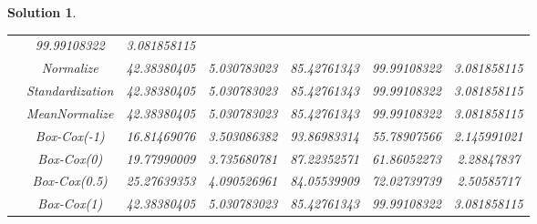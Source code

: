 \documentclass[a4paper,UTF8]{article}
\numberwithin{equation}{section}
\newtheorem*{mySol}{Solution}
\begin{document}
\begin{mySol}
\begin{table}[]
\begin{tabular}{ccccccc}
				         & 99.99108322
				           & 3.081858115 \\
				& Normalize & 42.38380405
				&  5.030783023
				&  85.42761343
				& 99.99108322
				& 3.081858115 \\
				& Standardization  & 42.38380405
				&  5.030783023
				&  85.42761343
				& 99.99108322
				& 3.081858115 \\
				& MeanNormalize & 42.38380405
				&  5.030783023
				&  85.42761343
				& 99.99108322
				& 3.081858115 \\
				& Box-Cox(-1) & 16.81469076	& 3.503086382	& 93.86983314 &	55.78907566	& 2.145991021 \\
				& Box-Cox(0) &	19.77990009 & 	3.735680781	& 87.22352571	& 61.86052273	& 2.28847837 \\
				& Box-Cox(0.5) & 25.27639353 &	4.090526961	& 84.05539909	& 72.02739739	& 2.50585717 \\
				& Box-Cox(1) & 42.38380405	& 5.030783023	& 85.42761343	& 99.99108322 &	3.081858115 \\
				\bottomrule
			\end{tabular}
			\label{tb:res}
		\end{table}


\end{mySol}
\end{document}
